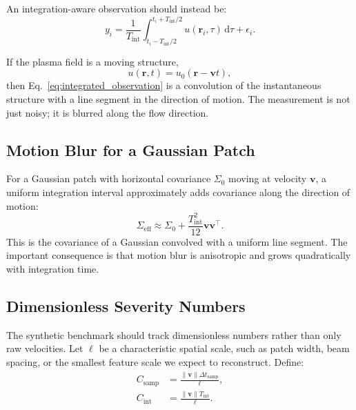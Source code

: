 \documentclass[11pt]{article}
\newcommand{\dd}{\mathrm{d}}
\begin{document}
An integration-aware observation should instead be:
\begin{equation}
  y_i
  =
  \frac{1}{T_{\mathrm{int}}}
  \int_{t_i-T_{\mathrm{int}}/2}^{t_i+T_{\mathrm{int}}/2}
  u(\mathbf{r}_i,\tau)\,\dd \tau
  +
  \epsilon_i.
  \label{eq:integrated_observation}
\end{equation}

If the plasma field is a moving structure,
\begin{equation}
  u(\mathbf{r},t) = u_0(\mathbf{r}-\mathbf{v}t),
\end{equation}
then Eq.~\ref{eq:integrated_observation} is a convolution of the instantaneous structure with a
line segment in the direction of motion. The measurement is not just noisy; it is blurred along
the flow direction.

\subsection{Motion Blur for a Gaussian Patch}

For a Gaussian patch with horizontal covariance $\Sigma_0$ moving at velocity $\mathbf{v}$, a
uniform integration interval approximately adds covariance along the direction of motion:
\begin{equation}
  \Sigma_{\mathrm{eff}}
  \approx
  \Sigma_0
  +
  \frac{T_{\mathrm{int}}^2}{12}
  \mathbf{v}\mathbf{v}^{\top}.
  \label{eq:motion_blur_covariance}
\end{equation}
This is the covariance of a Gaussian convolved with a uniform line segment. The important
consequence is that motion blur is anisotropic and grows quadratically with integration time.

\subsection{Dimensionless Severity Numbers}

The synthetic benchmark should track dimensionless numbers rather than only raw velocities.
Let $\ell$ be a characteristic spatial scale, such as patch width, beam spacing, or the smallest
feature scale we expect to reconstruct. Define:
\begin{align}
  C_{\mathrm{samp}} &= \frac{\|\mathbf{v}\|\Delta t_{\mathrm{samp}}}{\ell},
  \\
  C_{\mathrm{int}} &= \frac{\|\mathbf{v}\|T_{\mathrm{int}}}{\ell}.
\end{align}
\end{document}
